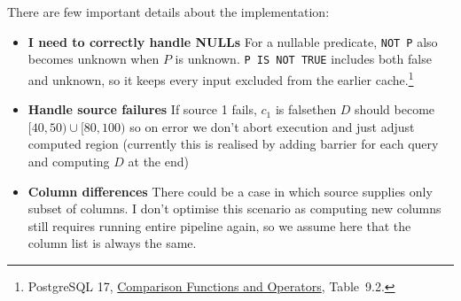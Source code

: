 There are few important details about the implementation:
\begin{itemize}
  \item \textbf{I need to correctly handle NULLs} For a nullable predicate, \texttt{NOT P} also becomes
    unknown when $P$ is unknown. \texttt{P IS NOT TRUE} includes both false
    and unknown, so it keeps every input excluded from the earlier
    cache.\footnote{PostgreSQL 17,
    \href{https://www.postgresql.org/docs/17/functions-comparison.html}
    {Comparison Functions and Operators}, Table~9.2.}
  \item \textbf{Handle source failures} If source 1 fails, $c_1$ is falsethen $D$ should become $[40,50)\cup[80,100)$ so on error we don't abort execution and just adjust computed region (currently this is realised by adding barrier for each query and computing $D$ at the end)
  \item \textbf{Column differences} There could be a case in which source supplies only subset of columns. I don't optimise this scenario as computing new columns still requires running entire pipeline again, so we assume here that the column list is always the same.
\end{itemize}
